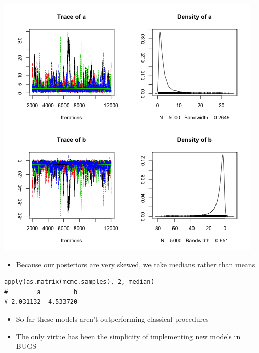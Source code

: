 \documentclass{beamer}
\begin{document}
\begin{frame}[fragile]
  \begin{center}
    \includegraphics[scale = 0.4]{../graphs/robit/plot1.png}
  \end{center}
\end{frame}

\begin{frame}
  \begin{itemize}
    \item{Because our posteriors are very skewed, we take medians rather than means}
  \end{itemize}
\end{frame}

\begin{frame}[fragile]
  \begin{verbatim}
apply(as.matrix(mcmc.samples), 2, median)
#        a         b 
# 2.031132 -4.533720 
  \end{verbatim}
\end{frame}

\begin{frame}
  \begin{itemize}
    \item{So far these models aren't outperforming classical procedures}
    \item{The only virtue has been the simplicity of implementing new models in BUGS}
  \end{itemize}
\end{frame}
\end{document}
